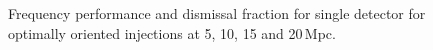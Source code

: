 \documentclass[showpacs, superscriptaddress, showpacs, letterpaper, showkeys,
preprintnumbers, altaffilletter, amssymb, amsmath, amsfonts, prd,
onecolumn, floatfix, nofootinbib]{revtex4-1}
\begin{document}
\begin{figure}
\begin{subfigure}{.4\textwidth}
{\label{fig:freqroc15Mpc}}
\end{subfigure}
%                                 
\begin{subfigure}{.4\textwidth}
{\label{fig:freqroc20Mpc}}
\end{subfigure}
\caption{Frequency performance and dismissal fraction for  single detector for
optimally oriented injections at 5, 10, 15 and 20\,Mpc.
\label{fig:freqroc}}
\end{figure}
\end{document}

